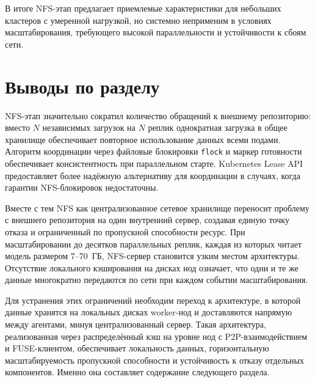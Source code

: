 В итоге NFS-этап предлагает приемлемые характеристики для небольших кластеров с умеренной нагрузкой, но системно неприменим в условиях масштабирования, требующего высокой параллельности и устойчивости к сбоям сети.

\section{Выводы по разделу}

NFS-этап значительно сократил количество обращений к внешнему репозиторию: вместо $N$ независимых загрузок на $N$ реплик однократная загрузка в общее хранилище обеспечивает повторное использование данных всеми подами. Алгоритм координации через файловые блокировки \texttt{flock} и маркер готовности обеспечивает консистентность при параллельном старте. Kubernetes Lease API предоставляет более надёжную альтернативу для координации в случаях, когда гарантии NFS-блокировок недостаточны.

Вместе с тем NFS как централизованное сетевое хранилище переносит проблему с внешнего репозитория на один внутренний сервер, создавая единую точку отказа и ограниченный по пропускной способности ресурс. При масштабировании до десятков параллельных реплик, каждая из которых читает модель размером 7--70~ГБ, NFS-сервер становится узким местом архитектуры. Отсутствие локального кэширования на дисках нод означает, что одни и те же данные многократно передаются по сети при каждом событии масштабирования.

Для устранения этих ограничений необходим переход к архитектуре, в которой данные хранятся на локальных дисках worker-нод и доставляются напрямую между агентами, минуя централизованный сервер. Такая архитектура, реализованная через распределённый кэш на уровне нод с P2P-взаимодействием и FUSE-клиентом, обеспечивает локальность данных, горизонтальную масштабируемость пропускной способности и устойчивость к отказу отдельных компонентов. Именно она составляет содержание следующего раздела.
